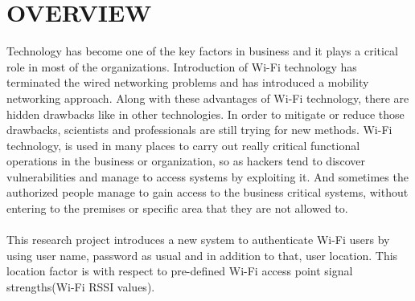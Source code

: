 \section{OVERVIEW}
Technology has become one of the key factors in business and it plays a critical role in most of the organizations. Introduction of Wi-Fi technology has terminated the wired networking problems and has introduced a mobility networking approach. Along with these advantages of Wi-Fi technology, there are hidden drawbacks like in other technologies. In order to mitigate or reduce those drawbacks, scientists and professionals are still trying for new methods. Wi-Fi technology, is used in many places to carry out really critical functional operations in the business or organization, so as hackers tend to discover vulnerabilities and manage to access systems by exploiting it. 
And sometimes the authorized people manage to gain access to the business critical systems, without entering to the premises or specific area that they are not allowed to. 

\paragraph{}
This research project introduces a new system to authenticate Wi-Fi users by using user name, password as usual and in addition to that, user location. This location factor is with respect to pre-defined Wi-Fi access point signal strengths(Wi-Fi RSSI values).

